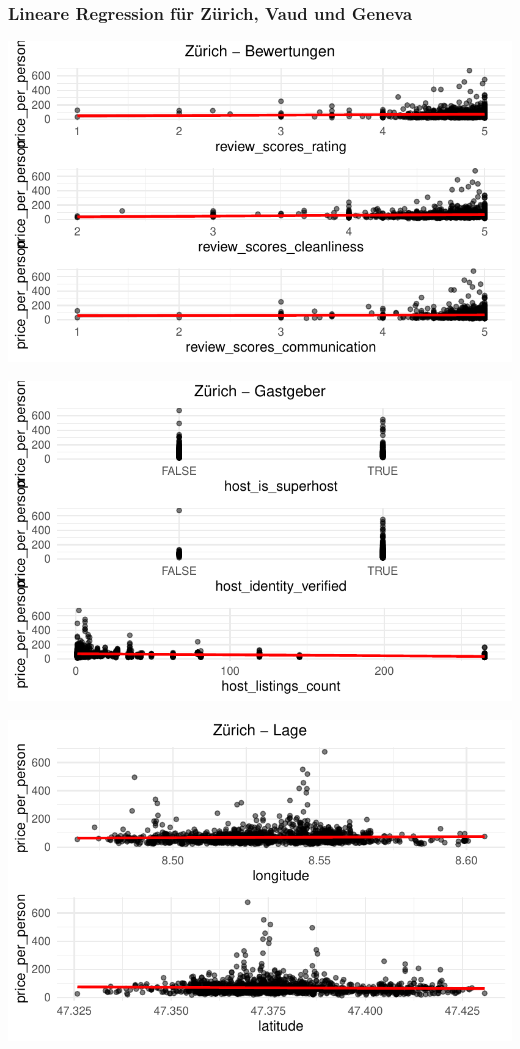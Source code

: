 \documentclass[
  journal,
]{IEEEtran}%
\begin{document}
\hypertarget{lineare-regression-fuxfcr-zuxfcrich-vaud-und-geneva}{%
\subsubsection{Lineare Regression für Zürich, Vaud und
Geneva}\label{lineare-regression-fuxfcr-zuxfcrich-vaud-und-geneva}}

\includegraphics{main_files/figure-pdf/unnamed-chunk-13-1.pdf}

\includegraphics{main_files/figure-pdf/unnamed-chunk-13-2.pdf}

\includegraphics{main_files/figure-pdf/unnamed-chunk-13-3.pdf}
\end{document}
